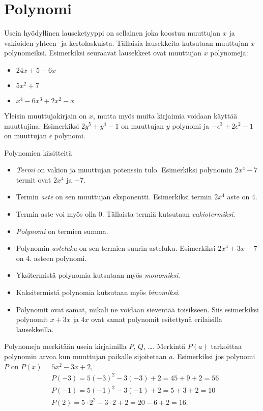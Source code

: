 \chapter{Polynomi}
Usein hyödyllinen lauseketyyppi on sellainen joka koostuu muuttujan $x$ ja
vakioiden yhteen- ja kertolaskuista. Tällaisia lausekkeita kutsutaan muuttujan
$x$ polynomeiksi. Esimerkiksi seuraavat lausekkeet ovat muuttujan $x$ polynomeja:
\begin{itemize}
\item $24x + 5 - 6x$
\item $5x^2+7$
\item $x^4-6x^3+2x^2-x$
\end{itemize}

Yleisin muuttujakirjain on $x$, mutta myös muita kirjaimia voidaan käyttää
muuttujina. Esimerkiksi $2y^5+y^4-1$ on muuttujan $y$ polynomi ja
$-\epsilon^3+2\epsilon^2-1$ on muuttujan $\epsilon$ polynomi.

Polynomien käsitteitä
\begin{itemize}
\item \emph{Termi} on vakion ja muuttujan potenssin tulo. Esimerkiksi
	polynomin $2x^4 - 7$ termit ovat $2x^4$ ja $-7$.
\item Termin \emph{aste} on sen muuttujan eksponentti. Esimerkiksi termin
	$2x^4$ aste on 4.
\item Termin aste voi myös olla 0. Tällaista termiä kutsutaan \emph{vakiotermiksi}.
\item \emph{Polynomi} on termien summa.
\item Polynomin \emph{asteluku} on sen termien suurin asteluku. Esimerkiksi $2x^4 + 3x - 7$ on 4. asteen polynomi.
\item Yksitermistä polynomia kutsutaan myös \emph{monomiksi}.
\item Kaksitermistä polynomia kutsutaan myös \emph{binomiksi}.
\item Polynomit ovat samat, mikäli ne voidaan sieventää toisikseen. Siis
esimerkiksi polynomit $x+3x$ ja $4x$ ovat samat polynomit esitettynä
erilaisilla lausekkeilla.
\end{itemize}

Polynomeja merkitään usein kirjaimilla $P$, $Q$, \ldots. Merkintä $P(a)$
tarkoittaa polynomin arvoa kun muuttujan paikalle sijoitetaan $a$. Esimerkiksi
jos polynomi $P$ on $P(x) = 5x^2-3x+2$,
\begin{align*}
&P(-3) = 5(-3)^2-3(-3)+2 = 45 + 9 + 2 = 56 \\
&P(-1) = 5(-1)^2-3(-1)+2 = 5 + 3 + 2 = 10 \\
&P(2) = 5\cdot 2^2-3\cdot 2+2 = 20 - 6 + 2 = 16.
\end{align*}

